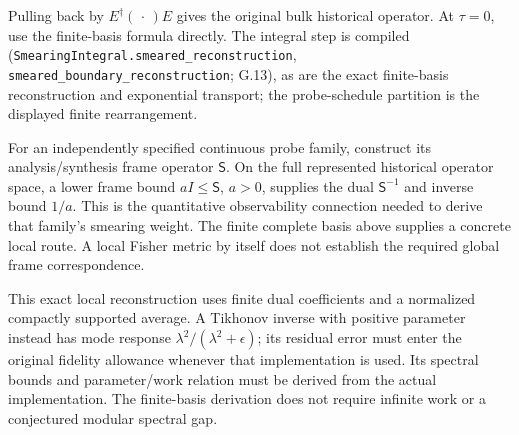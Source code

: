 \documentclass[
]{article}
\begin{document}
Pulling back by \(E^\dagger(\,\cdot\,)E\) gives the original bulk
historical operator. At \(\tau=0\), use the finite-basis formula
directly. The integral step is compiled
(\texttt{S\allowbreak{}m\allowbreak{}e\allowbreak{}a\allowbreak{}r\allowbreak{}i\allowbreak{}n\allowbreak{}g\allowbreak{}I\allowbreak{}n\allowbreak{}t\allowbreak{}e\allowbreak{}g\allowbreak{}r\allowbreak{}a\allowbreak{}l\allowbreak{}.\allowbreak{}s\allowbreak{}m\allowbreak{}e\allowbreak{}a\allowbreak{}r\allowbreak{}e\allowbreak{}d\allowbreak{}\_\allowbreak{}r\allowbreak{}e\allowbreak{}c\allowbreak{}o\allowbreak{}n\allowbreak{}s\allowbreak{}t\allowbreak{}r\allowbreak{}u\allowbreak{}c\allowbreak{}t\allowbreak{}i\allowbreak{}o\allowbreak{}n},
\texttt{s\allowbreak{}m\allowbreak{}e\allowbreak{}a\allowbreak{}r\allowbreak{}e\allowbreak{}d\allowbreak{}\_\allowbreak{}b\allowbreak{}o\allowbreak{}u\allowbreak{}n\allowbreak{}d\allowbreak{}a\allowbreak{}r\allowbreak{}y\allowbreak{}\_\allowbreak{}r\allowbreak{}e\allowbreak{}c\allowbreak{}o\allowbreak{}n\allowbreak{}s\allowbreak{}t\allowbreak{}r\allowbreak{}u\allowbreak{}c\allowbreak{}t\allowbreak{}i\allowbreak{}o\allowbreak{}n};
G.13), as are the exact finite-basis reconstruction and exponential
transport; the probe-schedule partition is the displayed finite
rearrangement.

For an independently specified continuous probe family, construct its
a\allowbreak{}n\allowbreak{}a\allowbreak{}l\allowbreak{}y\allowbreak{}s\allowbreak{}i\allowbreak{}s\allowbreak{}/\allowbreak{}s\allowbreak{}y\allowbreak{}n\allowbreak{}t\allowbreak{}h\allowbreak{}e\allowbreak{}s\allowbreak{}i\allowbreak{}s
frame operator \(\mathsf S\). On the full represented historical
operator space, a lower frame bound \(aI\le\mathsf S\), \(a>0\),
supplies the dual \(\mathsf S^{-1}\) and inverse bound \(1/a\). This is
the quantitative observability connection needed to derive that family's
smearing weight. The finite complete basis above supplies a concrete
local route. A local Fisher metric by itself does not establish the
required global frame correspondence.

This exact local reconstruction uses finite dual coefficients and a
normalized compactly supported average. A Tikhonov inverse with positive
parameter instead has mode response \(\lambda^2/(\lambda^2+\epsilon)\);
its residual error must enter the original fidelity allowance whenever
that implementation is used. Its spectral bounds and parameter/work
relation must be derived from the actual implementation. The
finite-basis derivation does not require infinite work or a conjectured
modular spectral gap.
\end{document}

